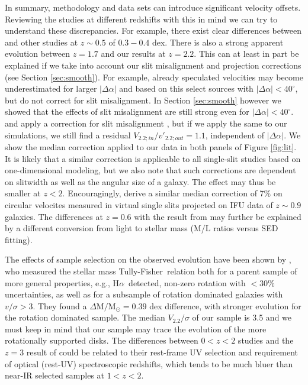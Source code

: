 \documentclass{emulateapj}
\newcommand{\ha}{H$\alpha$}
\newcommand{\msun}{$\mathrm{M_{\odot}}$}
\newcommand{\tf}{Tully-Fisher}
\begin{document}
{In summary, methodology and data sets can introduce significant {velocity} offsets. Reviewing the studies at different redshifts with this in mind we can try to understand these discrepancies. For example, there exist clear differences between \citet{Puech08} and other studies \citep[e.g.][]{Conselice05,Kassin07,Miller11} at $z\sim0.5$ of $0.3-0.4$ dex. {There is also a strong apparent evolution between $z=1.7$ \citep[][based on one-dimensional modeling of single-slit data]{Miller12} and our results at $z=2.2$. This can at least in part be explained if we take into account our slit misalignment and projection corrections (see Section \ref{sec:smooth}). For example, \citet{Weiner06a} already speculated velocities may become underestimated for larger $|\Delta \alpha|$ and based on this \citet{Kassin07} select sources with $|\Delta \alpha|<40^{\circ}$, but do not correct for slit misalignment. In Section \ref{sec:smooth} however we showed that the effects of slit misalignment are still strong even for $|\Delta \alpha|<40^{\circ}$. \citet{Miller11} and \citet{Miller12} apply a correction for slit misalignment \citep[][Equation 4]{Miller11}, but if we apply the same to our simulations, we still find a residual $V_{2.2;in}/v'_{2.2;out}=1.1$, independent of $|\Delta \alpha|$. We show the median correction applied to our data in both panels of Figure \ref{fig:lit}. It is likely that a similar correction is applicable to all single-slit studies based on one-dimensional modeling, but we also note that such corrections are dependent on slitwidth as well as the angular size of a galaxy. The effect may thus be smaller at $z<2$. Encouragingly, \citet{Harrison17} derive a similar median correction of 7\% on circular velocites measured in virtual single slits projected on IFU data of $z\sim0.9$ galaxies.} {The differences at $z=0.6$ with the result from} \citet{Puech08} {may further be explained by a different conversion from light to stellar mass (M/L ratios versus SED fitting).}

{The effects of sample selection on the observed evolution have been shown by \citet{Tiley16}, who measured the stellar mass \tf\ relation both for a parent sample of more general properties, e.g., \ha\ detected, non-zero rotation with $<30\%$ uncertainties, as well as for a subsample of rotation dominated galaxies with $v/\sigma>3$. They found a $\Delta \mathrm{M}/$\msun$=0.39$ dex difference, with stronger evolution for the rotation dominated sample. The median $V_{2.2}/\sigma$ of our sample is 3.{5} and we must keep in mind that our sample may trace the evolution of the more rotationally supported disks.}  The differences between $0 < z < 2$ studies and the $z=3$ result of \citet{Gnerucci11} could be related to their rest-frame UV selection and requirement of optical (rest-UV) spectroscopic redshifts, which tends to be much bluer than near-IR selected samples at $1 < z < 2$.

}
\end{document}
